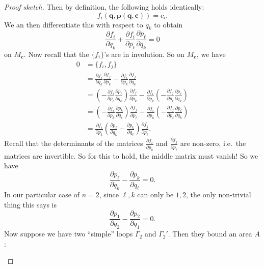 \documentclass[a4paper]{article}
\begin{document}
\begin{proof}[Proof sketch]
  Then by definition, the following holds identically:
  \[
    f_i(\mathbf{q}, \mathbf{p}(\mathbf{q}, \mathbf{c})) = c_i.
  \]
  We an then differentiate this with respect to $q_k$ to obtain
  \[
    \frac{\partial f_i}{\partial q_k} + \frac{\partial f_i}{\partial p_\ell} \frac{\partial p_\ell}{\partial q_k} = 0
  \]
  on $M_\mathbf{c}$. Now recall that the $\{f_i\}$'s are in involution. So on $M_\mathbf{c}$, we have
  \begin{align*}
    0 &= \{f_i, f_j\} \\
    &= \frac{\partial f_i}{\partial q_k} \frac{\partial f_j}{\partial p_k} - \frac{\partial f_i}{\partial p_k} \frac{\partial f_j}{\partial q_k}\\
    &= \left(-\frac{\partial f_i}{\partial p_\ell} \frac{\partial p_\ell}{\partial q_k}\right)\frac{\partial f_j}{\partial p_k} - \frac{\partial f_i}{\partial p_k}\left(-\frac{\partial f_j}{\partial p_\ell} \frac{\partial p_\ell}{\partial q_k}\right)\\
    &= \left(-\frac{\partial f_i}{\partial p_k} \frac{\partial p_k}{\partial q_\ell}\right)\frac{\partial f_j}{\partial p_\ell} - \frac{\partial f_i}{\partial p_k}\left(-\frac{\partial f_j}{\partial p_\ell} \frac{\partial p_\ell}{\partial q_k}\right)\\
    &= \frac{\partial f_i}{\partial p_k} \left(\frac{\partial p_\ell}{\partial q_k} - \frac{\partial p_k}{\partial q_\ell}\right) \frac{\partial f_j}{\partial p_\ell}.
  \end{align*}
  Recall that the determinants of the matrices $\frac{\partial f_i}{\partial p_k}$ and $\frac{\partial f_j}{\partial p_\ell}$ are non-zero, i.e.\ the matrices are invertible. So for this to hold, the middle matrix must vanish! So we have
  \[
    \frac{\partial p_\ell}{\partial q_k} - \frac{\partial p_k}{\partial q_\ell} = 0.
  \]
  In our particular case of $n = 2$, since $\ell, k$ can only be $1, 2$, the only non-trivial thing this says is
  \[
    \frac{\partial p_1}{\partial q_2} - \frac{\partial p_2}{\partial q_1} = 0.
  \]
  Now suppose we have two ``simple'' loops $\Gamma_2$ and $\Gamma_2'$. Then they bound an area $A$:
  \begin{center}
\end{center}
\end{proof}
\end{document}
